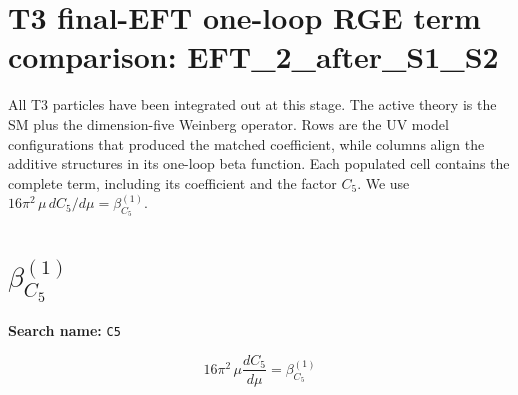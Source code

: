 \documentclass[8pt]{article}
\begin{document}
\begin{landscape}
\section*{T3 final-EFT one-loop RGE term comparison: EFT\_2\_after\_S1\_S2}
All T3 particles have been integrated out at this stage. The active theory is the SM plus the dimension-five Weinberg operator. Rows are the UV model configurations that produced the matched coefficient, while columns align the additive structures in its one-loop beta function. Each populated cell contains the complete term, including its coefficient and the factor $C_5$.
\medskip
We use $16\pi^2\,\mu\,dC_5/d\mu=\beta_{C_5}^{(1)}$.
\section*{$\beta_{C_5}^{(1)}$}
\noindent\textbf{Search name: }\texttt{C5}\par\smallskip
\[16\pi^2\,\mu\frac{dC_5}{d\mu}=\beta_{C_5}^{(1)}\]

\end{landscape}
\end{document}
